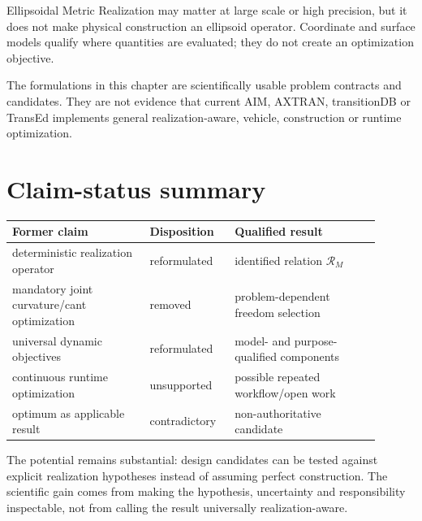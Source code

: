 Ellipsoidal Metric Realization may matter at large scale or high precision,
but it does not make physical construction an ellipsoid operator. Coordinate
and surface models qualify where quantities are evaluated; they do not create
an optimization objective.

The formulations in this chapter are scientifically usable problem contracts
and candidates. They are not evidence that current AIM, AXTRAN, transitionDB
or TransEd implements general realization-aware, vehicle, construction or
runtime optimization.

\section{Claim-status summary}

\begin{center}
\small
\begin{tabular}{p{0.34\linewidth}p{0.20\linewidth}p{0.36\linewidth}}
\toprule
Former claim & Disposition & Qualified result\\
\midrule
deterministic realization operator & reformulated & identified relation \(\mathcal R_M\)\\
mandatory joint curvature/cant optimization & removed & problem-dependent freedom selection\\
universal dynamic objectives & reformulated & model- and purpose-qualified components\\
continuous runtime optimization & unsupported & possible repeated workflow/open work\\
optimum as applicable result & contradictory & non-authoritative candidate\\
\bottomrule
\end{tabular}
\end{center}

The potential remains substantial: design candidates can be tested against
explicit realization hypotheses instead of assuming perfect construction.
The scientific gain comes from making the hypothesis, uncertainty and
responsibility inspectable, not from calling the result universally
realization-aware.
